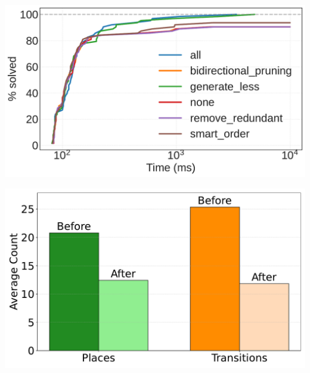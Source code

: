 \begin{center}
		\begin{minipage}[t]{0.48\textwidth}
		\centering
		\includegraphics[width=\linewidth]{plots/timeout_10000_cumulative_solved_log.pdf}
		\label{fig:timeout_cumulative_solved_log}
	\end{minipage}\hfill
	\begin{minipage}[t]{0.48\textwidth}
		\centering
		\includegraphics[width=\linewidth]{plots/petri_size_reduction_plot_timeout_120s.pdf}
		\label{fig:petri_size_reduction}
	\end{minipage}
\end{center}






